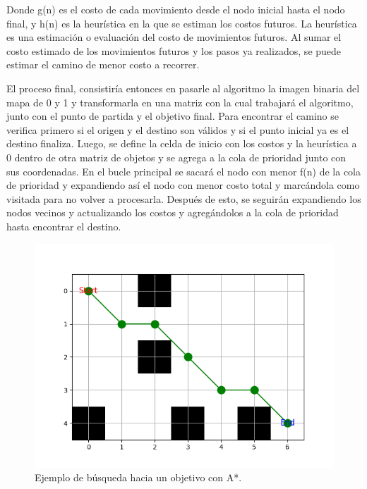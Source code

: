 Donde g(n) es el costo de cada movimiento desde el nodo inicial hasta el nodo final, y h(n) es la
heurística en la que se estiman los costos futuros. La heurística es una estimación o evaluación del costo de
movimientos futuros. Al sumar el costo estimado de los movimientos futuros y los pasos ya realizados, se puede estimar el camino de menor costo a recorrer.


El proceso final, consistiría entonces en pasarle al algoritmo la imagen binaria del mapa de 0 y 1 y transformarla en una matriz con la cual trabajará el algoritmo, junto con el punto de partida y el objetivo final. Para encontrar el camino se verifica primero si el origen y el destino son válidos y si el punto inicial ya es el destino finaliza. Luego, se define la celda de inicio con los costos y la heurística a 0 dentro de otra matriz de objetos y se agrega a la cola de prioridad junto con sus coordenadas. En el bucle principal se sacará el nodo con menor f(n) de la cola de prioridad y expandiendo así el nodo con menor costo total y marcándola como visitada para no volver a procesarla. Después de esto, se seguirán expandiendo los nodos vecinos y actualizando los costos y agregándolos a la cola de prioridad hasta encontrar el destino.

\begin{figure}[H]
  \centering
  \includegraphics[scale=0.6]{figs/astar4} %
  \caption{ Ejemplo de búsqueda hacia un objetivo con A*.}
  \label{fig:mel}
\end{figure}

